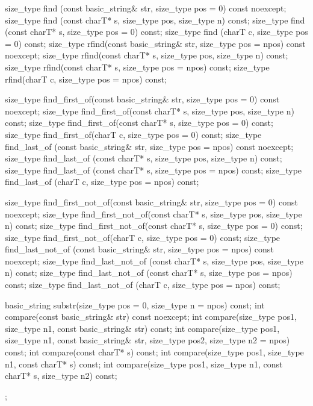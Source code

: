 \begin{codeblock}
{{    size_type find (const basic_string& str, size_type pos = 0) const noexcept;
    size_type find (const charT* s, size_type pos, size_type n) const;
    size_type find (const charT* s, size_type pos = 0) const;
    size_type find (charT c, size_type pos = 0) const;
    size_type rfind(const basic_string& str, size_type pos = npos) const noexcept;
    size_type rfind(const charT* s, size_type pos, size_type n) const;
    size_type rfind(const charT* s, size_type pos = npos) const;
    size_type rfind(charT c, size_type pos = npos) const;

    size_type find_first_of(const basic_string& str,
                            size_type pos = 0) const noexcept;
    size_type find_first_of(const charT* s,
                            size_type pos, size_type n) const;
    size_type find_first_of(const charT* s, size_type pos = 0) const;
    size_type find_first_of(charT c, size_type pos = 0) const;
    size_type find_last_of (const basic_string& str,
                            size_type pos = npos) const noexcept;
    size_type find_last_of (const charT* s,
                            size_type pos, size_type n) const;
    size_type find_last_of (const charT* s, size_type pos = npos) const;
    size_type find_last_of (charT c, size_type pos = npos) const;

    size_type find_first_not_of(const basic_string& str,
                size_type pos = 0) const noexcept;
    size_type find_first_not_of(const charT* s, size_type pos,
                                size_type n) const;
    size_type find_first_not_of(const charT* s, size_type pos = 0) const;
    size_type find_first_not_of(charT c, size_type pos = 0) const;
    size_type find_last_not_of (const basic_string& str,
                                size_type pos = npos) const noexcept;
    size_type find_last_not_of (const charT* s, size_type pos,
                                size_type n) const;
    size_type find_last_not_of (const charT* s,
                                size_type pos = npos) const;
    size_type find_last_not_of (charT c, size_type pos = npos) const;

    basic_string substr(size_type pos = 0, size_type n = npos) const;
    int compare(const basic_string& str) const noexcept;
    int compare(size_type pos1, size_type n1,
                const basic_string& str) const;
    int compare(size_type pos1, size_type n1,
                const basic_string& str,
                size_type pos2, size_type n2 = npos) const;
    int compare(const charT* s) const;
    int compare(size_type pos1, size_type n1,
                const charT* s) const;
    int compare(size_type pos1, size_type n1,
                const charT* s, size_type n2) const;
  };
}
\end{codeblock}

